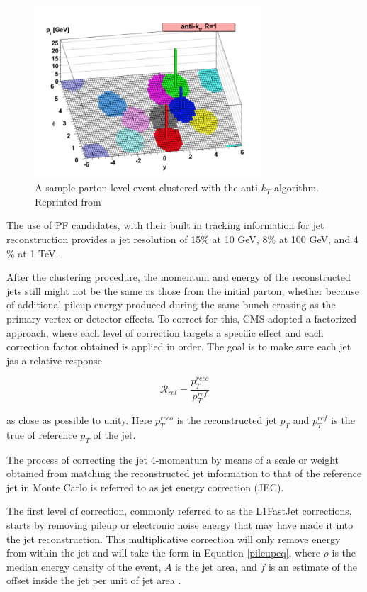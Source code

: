 \begin{figure}[h]
  	\label{fig:antikt}
 	\centering
 	\includegraphics[width=0.75\textwidth]{figures/antikt.png}
 	\singlespace
 	\caption{A sample parton-level event clustered with the anti-$k_{T}$ algorithm. Reprinted from \cite{Cacciari:2008gp}}
 \end{figure}

The use of PF candidates, with their built in tracking information for jet reconstruction provides a jet resolution of 15$\%$ at 10 GeV, 8$\%$ at 100 GeV, and 4$\%$ at 1 TeV\cite{CMS-PAS-PFT-09-001}. 

After the clustering procedure, the momentum and energy of the reconstructed jets still might not be the same as those from the initial parton, whether because of additional pileup energy produced during the same bunch crossing as the primary vertex or detector effects. To correct for this, CMS adopted a factorized approach, where each level of correction targets a specific effect and each correction factor obtained is applied in order. The goal is to make sure each jet jas a relative response

\begin{equation}
\mathcal{R}_{rel} = \frac{p_{T}^{reco}}{p_{T}^{ref}} 
\end{equation}

as close as possible to unity. Here $p_{T}^{reco}$ is the reconstructed jet $p_{T}$ and $p_{T}^{ref}$ is the true of reference $p_{T}$ of the jet. 

The process of correcting the jet 4-momentum by means of a scale or weight obtained from matching the reconstructed jet information to that of the reference jet in Monte Carlo is referred to as jet energy correction (JEC).

The first level of correction, commonly referred to as the L1FastJet corrections, starts by removing pileup or electronic noise energy that may have made it into the jet reconstruction. This multiplicative correction will only remove energy from within the jet and will take the form in Equation \ref{pileupeq}, where $\rho$ is the median energy density of the event, $A$ is the jet area, and $f$ is an estimate of the offset inside the jet per unit of jet area \cite{JINST2011,Cacciari2007}.

